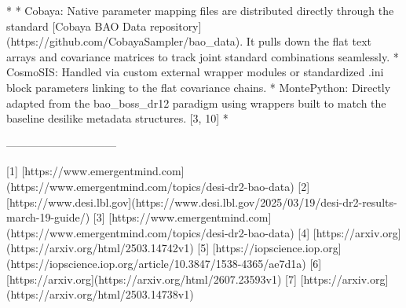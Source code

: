 * 
* Cobaya: Native parameter mapping files are distributed directly through the standard [Cobaya BAO Data repository](https://github.com/CobayaSampler/bao_data). It pulls down the flat text arrays and covariance matrices to track joint standard combinations seamlessly.
* CosmoSIS: Handled via custom external wrapper modules or standardized .ini block parameters linking to the flat covariance chains.
* MontePython: Directly adapted from the bao_boss_dr12 paradigm using wrappers built to match the baseline desilike metadata structures. [3, 10] 
* 

------------------------------

[1] [https://www.emergentmind.com](https://www.emergentmind.com/topics/desi-dr2-bao-data)
[2] [https://www.desi.lbl.gov](https://www.desi.lbl.gov/2025/03/19/desi-dr2-results-march-19-guide/)
[3] [https://www.emergentmind.com](https://www.emergentmind.com/topics/desi-dr2-bao-data)
[4] [https://arxiv.org](https://arxiv.org/html/2503.14742v1)
[5] [https://iopscience.iop.org](https://iopscience.iop.org/article/10.3847/1538-4365/ae7d1a)
[6] [https://arxiv.org](https://arxiv.org/html/2607.23593v1)
[7] [https://arxiv.org](https://arxiv.org/html/2503.14738v1)

